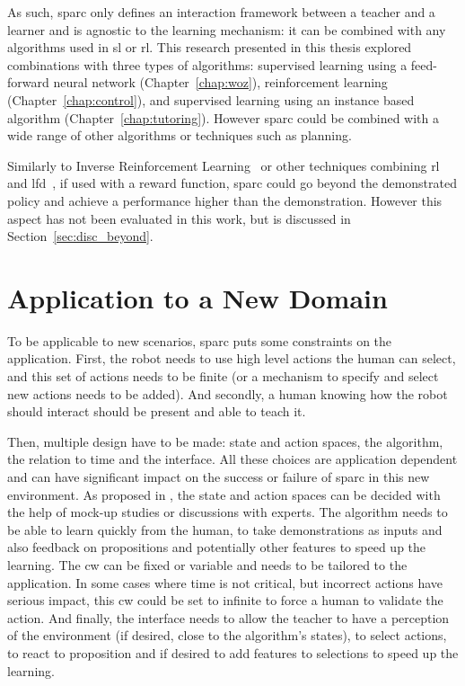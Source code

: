 As such, \gls{sparc} only defines an interaction framework between a teacher and a learner and is agnostic to the learning mechanism: it can be combined with any algorithms used in \gls{sl} or \gls{rl}. This research presented in this thesis explored combinations with three types of algorithms: supervised learning using a feed-forward neural network (Chapter~\ref{chap:woz}), reinforcement learning (Chapter~\ref{chap:control}), and supervised learning using an instance based algorithm (Chapter~\ref{chap:tutoring}). However \gls{sparc} could be combined with a wide range of other algorithms or techniques such as planning.

Similarly to Inverse Reinforcement Learning~\citep{abbeel2004apprenticeship} or other techniques combining \gls{rl} and \gls{lfd}~\citep{billard2008robot}, if used with a reward function, \gls{sparc} could go beyond the demonstrated policy and achieve a performance higher than the demonstration. However this aspect has not been evaluated in this work, but is discussed in Section~\ref{sec:disc_beyond}.

\section{Application to a New Domain}

To be applicable to new scenarios, \gls{sparc} puts some constraints on the application. First, the robot needs to use high level actions the human can select, and this set of actions needs to be finite (or a mechanism to specify and select new actions needs to be added). And secondly, a human knowing how the robot should interact should be present and able to teach it.

Then, multiple design have to be made: state and action spaces, the algorithm, the relation to time and the interface.  All these choices are application dependent and can have significant impact on the success or failure of \gls{sparc} in this new environment. As proposed in \cite{sequeira2016discovering}, the state and action spaces can be decided with the help of mock-up studies or discussions with experts. The algorithm needs to be able to learn quickly from the human, to take demonstrations as inputs and also feedback on propositions and potentially other features to speed up the learning. The \gls{cw} can be fixed or variable and needs to be tailored to the application. In some cases where time is not critical, but incorrect actions have serious impact, this \gls{cw} could be set to infinite to force a human to validate the action. And finally, the interface needs to allow the teacher to have a perception of the environment (if desired, close to the algorithm's states), to select actions, to react to proposition and if desired to add features to selections to speed up the learning.

